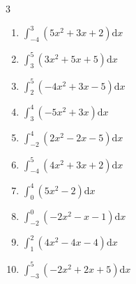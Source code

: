 \begin{multicols}{3}
\begin{enumerate}
  \item $\displaystyle \int_{-4}^{3}\left( 5x^{2}+3x+2 \right) \mathrm{d}x$


  \item $\displaystyle \int_{3}^{5}\left( 3x^{2}+5x+5 \right) \mathrm{d}x$


  \item $\displaystyle \int_{2}^{5}\left( -4x^{2}+3x-5 \right) \mathrm{d}x$

        \phantom{$\displaystyle =-127$}

  \item $\displaystyle \int_{3}^{4}\left( -5x^{2}+3x \right) \mathrm{d}x$


  \item $\displaystyle \int_{-2}^{4}\left( 2x^{2}-2x-5 \right) \mathrm{d}x$

        \phantom{$\displaystyle =31$}

\columnbreak %

\resetques

  \item $\displaystyle \int_{-4}^{5}\left( 4x^{2}+3x+2 \right) \mathrm{d}x$


  \item $\displaystyle \int_{0}^{4}\left( 5x^{2}-2 \right) \mathrm{d}x$


  \item $\displaystyle \int_{-2}^{0}\left( -2x^{2}-x-1 \right) \mathrm{d}x$


  \item $\displaystyle \int_{1}^{2}\left( 4x^{2}-4x-4 \right) \mathrm{d}x$


  \item $\displaystyle \int_{-3}^{5}\left( -2x^{2}+2x+5 \right) \mathrm{d}x$


\columnbreak %


\end{enumerate}
\end{multicols}
